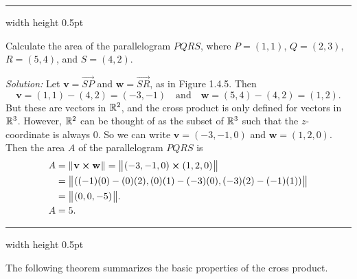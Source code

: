\hrule width \textwidth height 0.5pt
\begin{exmp}
 Calculate the area of the parallelogram $PQRS$, where $P = (1,1)$, $Q = (2,3)$, $R = (5,4)$, and
 $S = (4,2)$.\smallskip
 \piccaption[]{}
 \par\noindent\emph{Solution:} Let $\mathbf{v} = \overrightarrow{SP}$ and $\mathbf{w} = \overrightarrow{SR}$, as in
 Figure 1.4.5. 
 Then 
 \[\mathbf{v} = (1,1) - (4,2) = (-3,-1)\quad\text{and}\quad\mathbf{w} = (5,4) - (4,2) = (1,2).\] 
 But these are
 vectors in $\mathbb{R}^{2}$, and the cross product is only defined for vectors in $\mathbb{R}^{3}$. However, $\mathbb{R}^{2}$ can
 be thought of as the subset of $\mathbb{R}^{3}$ such that the $z$-coordinate is always $0$. So we can write
 $\mathbf{v} = (-3,-1,0)$ and $\mathbf{w} = (1,2,0)$. 
 Then the area $A$ of the parallelogram $PQRS$ is
 \begin{align*}
 A &= \lVert\mspace{1mu}\mathbf{v} \bm{\times} \mathbf{w}\mspace{1mu}\rVert = \bigl\lVert\mspace{1mu}(-3,-1,0) \bm{\times} (1,2,0)\mspace{1mu}\bigr\rVert\\
 &= \bigl\lVert\mspace{1mu}((-1)(0) - (0)(2), (0)(1) - (-3)(0), (-3)(2) - (-1)(1))\mspace{1mu}\bigr\rVert\\
 &= \bigl\lVert\mspace{1mu}(0,0, -5)\mspace{1mu}\bigr\rVert.\\
 A &= 5.
 \end{align*}
\end{exmp}

\hrule width \textwidth height 0.5pt
\medskip

The following theorem summarizes the basic properties of the cross product.

